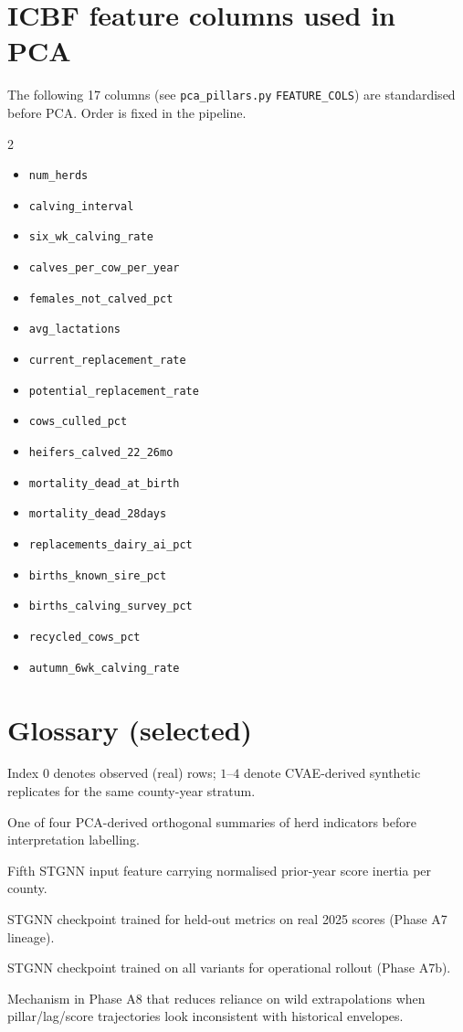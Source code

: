 \documentclass[11pt,a4paper]{article}
\begin{document}
\section{ICBF feature columns used in PCA}
\label{app:features}
The following 17 columns (see \texttt{pca\_pillars.py} \texttt{FEATURE\_COLS}) are standardised before PCA. Order is fixed in the pipeline.
\begin{multicols}{2}
\footnotesize
\begin{itemize}
  \item \texttt{num\_herds}
  \item \texttt{calving\_interval}
  \item \texttt{six\_wk\_calving\_rate}
  \item \texttt{calves\_per\_cow\_per\_year}
  \item \texttt{females\_not\_calved\_pct}
  \item \texttt{avg\_lactations}
  \item \texttt{current\_replacement\_rate}
  \item \texttt{potential\_replacement\_rate}
  \item \texttt{cows\_culled\_pct}
  \item \texttt{heifers\_calved\_22\_26mo}
  \item \texttt{mortality\_dead\_at\_birth}
  \item \texttt{mortality\_dead\_28days}
  \item \texttt{replacements\_dairy\_ai\_pct}
  \item \texttt{births\_known\_sire\_pct}
  \item \texttt{births\_calving\_survey\_pct}
  \item \texttt{recycled\_cows\_pct}
  \item \texttt{autumn\_6wk\_calving\_rate}
\end{itemize}
\end{multicols}

\section*{Glossary (selected)}
\begin{description}[style=sameline,leftmargin=3.2cm]
  \item[Variant ID] Index $0$ denotes observed (real) rows; $1$--$4$ denote CVAE-derived synthetic replicates for the same county-year stratum.
  \item[Pillar] One of four PCA-derived orthogonal summaries of herd indicators before interpretation labelling.
  \item[Lag channel] Fifth STGNN input feature carrying normalised prior-year score inertia per county.
  \item[Eval weights] STGNN checkpoint trained for held-out metrics on real 2025 scores (Phase A7 lineage).
  \item[Forecast weights] STGNN checkpoint trained on all variants for operational rollout (Phase A7b).
  \item[OOD blend] Mechanism in Phase A8 that reduces reliance on wild extrapolations when pillar/lag/score trajectories look inconsistent with historical envelopes.
\end{description}
\end{document}
